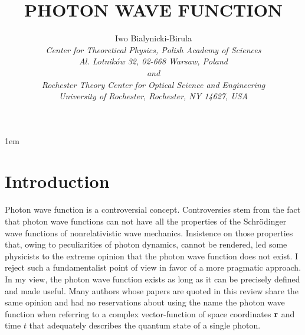 \documentclass[11pt]{article}
\begin{document}
\def\nocite#1{\@bsphack
  \if@filesw\immediate\write\@auxout{\string\citation{#1}}\fi
  \@esphack}


\def\@cite#1#2{{#1\if@tempswa , #2\fi}}
\def\@biblabel#1{[#1]}

\def\@listI{\leftmargin\leftmargini \parsep 0\p@ plus1\p@ minus\p@
\topsep 0\p@ plus3\p@ minus\p@
\itemsep 0\p@ plus1\p@ minus\p@}



  \ps@headings

\parindent1em

\title{PHOTON WAVE FUNCTION}

\author{Iwo Bialynicki-Birula\\
{\em Center for Theoretical Physics, Polish Academy of Sciences\\ Al.
Lotnik\'ow 32, 02-668 Warsaw, Poland\\and\\
Rochester Theory Center for Optical Science and Engineering\\
University of Rochester, Rochester, NY 14627, USA }}
\maketitle

\tableofcontents
\section{Introduction}

Photon wave function is a controversial concept. Controversies stem from the
fact that photon wave functions can not have all the properties of the
Schr\"odinger wave functions of nonrelativistic wave mechanics. Insistence
on those properties that, owing to peculiarities of photon dynamics, cannot
be rendered, led some physicists to the extreme opinion that the photon wave
function does not exist. I reject such a fundamentalist point of view in
favor of a more pragmatic approach. In my view, the photon wave function
exists as long as it can be precisely defined and made useful. Many authors
whose papers are quoted in this review share the same opinion and had no
reservations about using the name the photon wave function when referring to
a complex vector-function of space coordinates ${\bf r}$ and time $t$ that
adequately describes the quantum state of a single photon.
\end{document}
